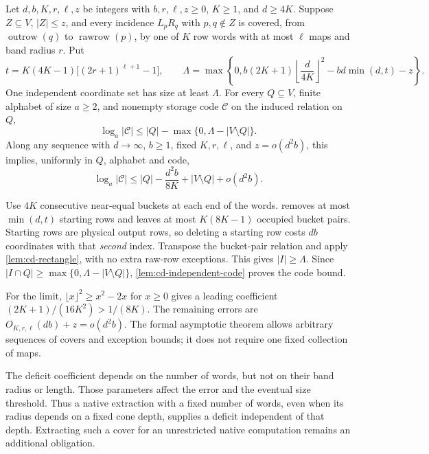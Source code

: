 \begin{theorem}\label{thm:rw-deficit}
Let $d,b,K,r,\ell,z$ be integers with $b,r,\ell,z\ge0$, $K\ge1$,
and $d\ge4K$. Suppose $Z\subseteq V$,
$|Z|\le z$, and every incidence $L_pR_q$ with $p,q\notin Z$ is
covered, from $\operatorname{outrow}(q)$ to $\operatorname{rawrow}(p)$,
by one of $K$ row words with at most $\ell$ maps and band radius $r$.
Put
\[
 t=K(4K-1)\bigl[(2r+1)^{\ell+1}-1\bigr],\qquad
 \Lambda=\max\left\{0,
 b(2K+1)\left\lfloor\frac d{4K}\right\rfloor^2
                  -bd\min(d,t)-z\right\}.
\]
One independent coordinate set has size at least $\Lambda$.
For every $Q\subseteq V$, finite alphabet of size $a\ge2$, and nonempty
storage code $\mathcal C$ on the induced relation on $Q$,
\[
 \log_a|\mathcal C|\le |Q|-\max\{0,\Lambda-|V\setminus Q|\}.
\]
Along any sequence with $d\to\infty$, $b\ge1$, fixed $K,r,\ell$,
and $z=o(d^2b)$, this implies, uniformly in $Q$, alphabet and code,
\[
 \log_a|\mathcal C|\le |Q|-\frac{d^2b}{8K}
                       +|V\setminus Q|+o(d^2b).
\]
\end{theorem}
\begin{outline}
Use $4K$ consecutive near-equal buckets at each end of the words.
 removes at most $\min(d,t)$ starting rows
and leaves at most $K(8K-1)$ occupied bucket pairs. Starting rows are
physical output rows, so deleting a starting row costs $db$ coordinates
with that \emph{second} index. Transpose the bucket-pair relation and
apply \cref{lem:cd-rectangle}, with no extra raw-row exceptions.
This gives $|I|\ge\Lambda$. Since
$|I\cap Q|\ge\max\{0,\Lambda-|V\setminus Q|\}$,
\cref{lem:cd-independent-code} proves the code bound.

For the limit, $\lfloor x\rfloor^2\ge x^2-2x$ for $x\ge0$ gives a
leading coefficient $(2K+1)/(16K^2)>1/(8K)$.
The remaining errors are $O_{K,r,\ell}(db)+z=o(d^2b)$.
The formal asymptotic theorem allows arbitrary sequences of covers and
exception bounds; it does not require one fixed collection of maps.
\end{outline}

The deficit coefficient depends on the number of words, but not on their
band radius or length. Those parameters affect the error and the eventual
size threshold. Thus a native extraction with a fixed number of words,
even when its radius depends on a fixed cone depth, supplies a deficit
independent of that depth. Extracting such a cover for an unrestricted
native computation remains an additional obligation.
